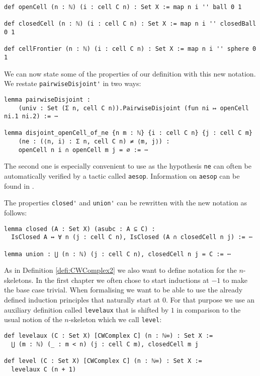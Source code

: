\begin{lstlisting}
def openCell (n : ℕ) (i : cell C n) : Set X := map n i '' ball 0 1

def closedCell (n : ℕ) (i : cell C n) : Set X := map n i '' closedBall 0 1

def cellFrontier (n : ℕ) (i : cell C n) : Set X := map n i '' sphere 0 1
\end{lstlisting}

We can now state some of the properties of our definition with this new notation.
We restate \lstinline{pairwiseDisjoint'} in two ways:

\begin{lstlisting}
lemma pairwiseDisjoint :
    (univ : Set (Σ n, cell C n)).PairwiseDisjoint (fun ni ↦ openCell ni.1 ni.2) := ⋯

lemma disjoint_openCell_of_ne {n m : ℕ} {i : cell C n} {j : cell C m}
    (ne : (⟨n, i⟩ : Σ n, cell C n) ≠ ⟨m, j⟩) :
    openCell n i ∩ openCell m j = ∅ := ⋯
\end{lstlisting}

The second one is especially convenient to use as the hypothesis \lstinline{ne} can often be automatically verified by a tactic called \lstinline{aesop}.
Information on \lstinline{aesop} can be found in \cite{Limperg2023}.

The properties \lstinline{closed'} and \lstinline{union'} can be rewritten with the new notation as follows:

\begin{lstlisting}
lemma closed (A : Set X) (asubc : A ⊆ C) :
  IsClosed A ↔ ∀ n (j : cell C n), IsClosed (A ∩ closedCell n j) := ⋯

lemma union : ⋃ (n : ℕ) (j : cell C n), closedCell n j = C := ⋯
\end{lstlisting}

As in Definition \ref{defi:CWComplex2} we also want to define notation for the $n$-skeletons.
In the first chapter we often chose to start inductions at $-1$ to make the base case trivial.
When formalising we want to be able to use the already defined induction principles that naturally start at $0$.
For that purpose we use an auxiliary definition called \lstinline{levelaux} that is shifted by $1$ in comparison to the usual notion of the $n$-skeleton which we call \lstinline{level}:

\begin{lstlisting}
def levelaux (C : Set X) [CWComplex C] (n : ℕ∞) : Set X :=
  ⋃ (m : ℕ) (_ : m < n) (j : cell C m), closedCell m j

def level (C : Set X) [CWComplex C] (n : ℕ∞) : Set X :=
  levelaux C (n + 1)
\end{lstlisting}

